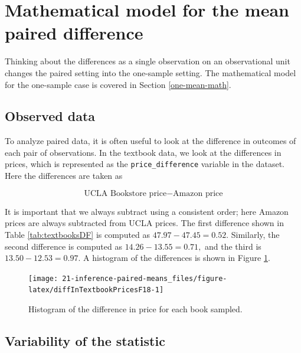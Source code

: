 \documentclass[
  10pt,
  openany]{book}
\begin{document}
\clearpage

\hypertarget{mathpaired}{%
\section{Mathematical model for the mean paired difference}\label{mathpaired}}

Thinking about the differences as a single observation on an observational unit changes the paired setting into the one-sample setting.
The mathematical model for the one-sample case is covered in Section \ref{one-mean-math}.

\hypertarget{observed-data-17}{%
\subsection{Observed data}\label{observed-data-17}}

To analyze paired data, it is often useful to look at the difference in outcomes of each pair of observations.
In the textbook data, we look at the differences in prices, which is represented as the \texttt{price\_difference} variable in the dataset.
Here the differences are taken as

\[\text{UCLA Bookstore price} - \text{Amazon price}\]

It is important that we always subtract using a consistent order; here Amazon prices are always subtracted from UCLA prices.
The first difference shown in Table \ref{tab:textbooksDF} is computed as \(47.97 - 47.45 = 0.52.\) Similarly, the second difference is computed as \(14.26 - 13.55 = 0.71,\) and the third is \(13.50 - 12.53 = 0.97.\) A histogram of the differences is shown in Figure \ref{fig:diffInTextbookPricesF18}.

\begin{figure}[h]

{\centering \texttt{[image: 21-inference-paired-means\_files/figure-latex/diffInTextbookPricesF18-1]} 

}

\caption{Histogram of the difference in price for each book sampled.}\label{fig:diffInTextbookPricesF18}
\end{figure}

\hypertarget{variability-of-the-statistic-16}{%
\subsection{Variability of the statistic}\label{variability-of-the-statistic-16}}
\end{document}
